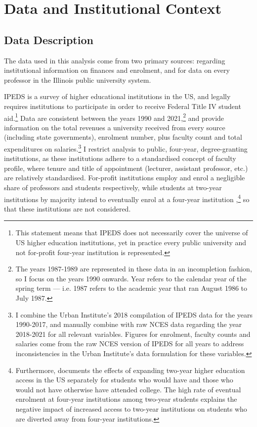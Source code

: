 \section{Data and Institutional Context}
\label{sec:data}

\subsection{Data Description}
The data used in this analysis come from two primary sources: \citet[IPEDS]{ipeds} regarding institutional information on finances and enrolment, and \citet[IBHED]{ibhed} for data on every professor in the Illinois public university system.

IPEDS is a survey of higher educational institutions in the US, and legally requires institutions to participate in order to receive Federal Title IV student aid.\footnote{
    This statement means that IPEDS does not necessarily cover the universe of US higher education institutions, yet in practice every public university and not for-profit four-year institution is represented.
}
Data are consistent between the years 1990 and 2021,\footnote{
    The years 1987-1989 are represented in these data in an incompletion fashion, so I focus on the years 1990 onwards.
    Year refers to the calendar year of the spring term --- i.e. 1987 refers to the academic year that ran August 1986 to July 1987.
}
and provide information on the total revenues a university received from every source (including state governments), enrolment number, plus faculty count and total expenditures on salaries.\footnote{
    I combine the Urban Institute's 2018 compilation of IPEDS data for the years 1990-2017, and manually combine with raw NCES data regarding the year 2018-2021 for all relevant variables.
    Figures for enrolment, faculty counts and salaries come from the raw NCES version of IPEDS for all years to address inconsistencies in the Urban Institute's data formulation for these variables.
}
I restrict analysis to public, four-year, degree-granting institutions, as these institutions adhere to a standardised concept of faculty profile, where tenure and title of appointment (lecturer, assistant professor, etc.) are relatively standardised.
For-profit institutions employ and enrol a negligible share of professors and students respectively, while students at two-year institutions by majority intend to eventually enrol at a four-year institution \citep{mountjoy2022},\footnote{
    Furthermore, \cite{mountjoy2022} documents the effects of expanding two-year higher education access in the US separately for students who would have and those who would not have otherwise have attended college.
    The high rate of eventual enrolment at four-year institutions among two-year students explains the negative impact of increased access to two-year institutions on students who are diverted away from four-year institutions.
}
so that these institutions are not considered.

